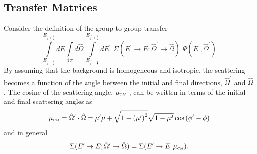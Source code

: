 \documentclass[../main.tex]{subfiles}
\begin{document}
\subsection{Transfer Matrices}
Consider the definition of the group to group transfer
\begin{equation} \label{eqn:g2g_transfer}
  \int\limits_{E_{g-\frac{1}{2}}}^{E_{g+\frac{1}{2}}} dE \int\limits_{4 \, \pi} d\hat{\Omega}^{\prime} \int\limits_{E_{g^{\prime}-\frac{1}{2}}}^{E_{g^{\prime}+\frac{1}{2}}} dE^{\prime} \,\, \Sigma(E^{\prime}\rightarrow E; \hat{\Omega}^{\prime} \rightarrow \hat{\Omega}) \,\, \Psi(E^{\prime},\hat{\Omega}^{\prime})
\end{equation}
By assuming that the background is homogeneous and isotropic, the scattering becomes a function of the angle between the initial and final directions, $\hat{\Omega}^{\prime}$ and $\hat{\Omega}$. The cosine of the scattering angle, $\mucm$ , can be written in terms of the initial and final scattering angles as
\begin{equation}
 \mucm = \hat{\Omega}^{\prime} \cdot \hat{\Omega} = \mu^{\prime} \mu + \sqrt{1-\left(\mu^{\prime}\right)^2} \sqrt{1-\mu^{2}} \cos\left(\phi^{\prime} - \phi \right) 
\end{equation}
and in general
\begin{equation} \label{eqn:mucm_dxs}
  \Sigma(E^{\prime}\rightarrow E; \hat{\Omega}^{\prime} \rightarrow \hat{\Omega}) = \Sigma(E^{\prime}\rightarrow E; \mucm).
\end{equation}
\end{document}
